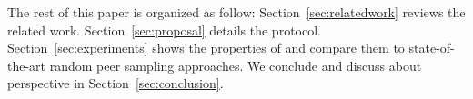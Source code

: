 The rest of this paper is organized as follow: Section~\ref{sec:relatedwork}
reviews the related work. Section~\ref{sec:proposal} details the \SCAMPLON{}
protocol.  Section~\ref{sec:experiments} shows the properties of \SCAMPLON{}
and compare them to state-of-the-art random peer sampling approaches. We
conclude and discuss about perspective in Section~\ref{sec:conclusion}.

